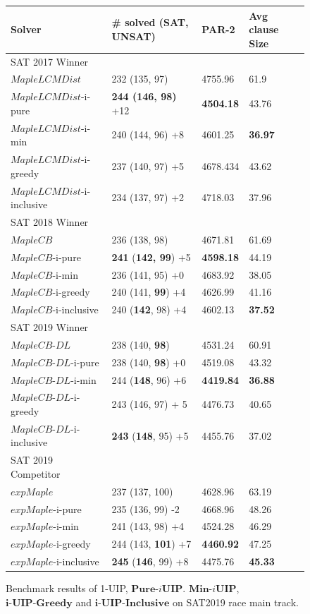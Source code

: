 \documentclass[runningheads]{llncs}
\newcommand{\IUIPPURE}{\textbf{Pure-$i$UIP}}
\newcommand{\IUIPMIN}{\textbf{Min-$i$UIP}}
\newcommand{\IUIPGreedy}{\textbf{i-UIP-Greedy}}
\newcommand{\IUIPActive}{\textbf{i-UIP-Inclusive}}
\newcommand{\MapleSeven}{\textit{MapleLCMDist}}
\newcommand{\MapleNineShort}{\textit{MapleCB-DL} }
\newcommand{\expSATShort}{\textit{expMaple} }
\newcommand{\MapleEightShort}{\textit{MapleCB}}
\begin{document}
\begin{figure} 
\begin{center}
\begin{tabular}{ | m{3.7cm} | m{4cm}| m{2cm} | m{2.75cm} |  } 
\hline
Solver & \# solved (SAT, UNSAT) & PAR-2 & Avg clause Size \\ 
\hline
SAT 2017 Winner & & & \\
$\MapleSeven$ & 232 (135, 97) & 4755.96 & 61.9  \\ 
\hline
$\MapleSeven$-i-pure & \textbf{244 (146, 98)} +12 & \textbf{4504.18} & 43.76 \\
\hline
$\MapleSeven$-i-min & 240 (144, 96) +8 & 4601.25 & \textbf{36.97} \\ 
\hline
$\MapleSeven$-i-greedy & 237 (140, 97) +5 & 4678.434 & 43.62 \\ 
\hline
$\MapleSeven$-i-inclusive & 234 (137, 97) +2 & 4718.03 & 37.96 \\
\hline
\hline
SAT 2018 Winner & & & \\
$\MapleEightShort$ & 236 (138, 98) & 4671.81 & 61.69 \\
\hline
$\MapleEightShort$-i-pure & \textbf{241} (\textbf{142, 99}) +5 & \textbf{4598.18} & 44.19 \\
\hline
$\MapleEightShort$-i-min & 236 (141, 95) +0 & 4683.92 & 38.05 \\ 
\hline
$\MapleEightShort$-i-greedy & 240 (141, \textbf{99}) +4 & 4626.99 & 41.16 \\
\hline
$\MapleEightShort$-i-inclusive & 240 (\textbf{142}, 98) +4 & 4602.13 & \textbf{37.52} \\
\hline
\hline
SAT 2019 Winner & & & \\
$\MapleNineShort$ & 238 (140, \textbf{98}) & 4531.24 & 60.91 \\
\hline
$\MapleNineShort$-i-pure & 238 (140, \textbf{98}) +0 & 4519.08 &  43.32\\
\hline
$\MapleNineShort$-i-min & 244 (\textbf{148}, 96) +6 & \textbf{4419.84} & \textbf{36.88} \\
\hline
$\MapleNineShort$-i-greedy & 243 (146, 97) + 5 & 4476.73 & 40.65 \\
\hline
$\MapleNineShort$-i-inclusive & \textbf{243} (\textbf{148}, 95) +5 & 4455.76 & 37.02 \\
\hline
\hline
SAT 2019 Competitor & & &\\
$\expSATShort$ & 237 (137, 100)  & 4628.96 & 63.19 \\
\hline
$\expSATShort$-i-pure & 235 (136, 99) -2  & 4668.96 & 48.26 \\
\hline
$\expSATShort$-i-min & 241 (143, 98) +4 & 4524.28 & 46.29 \\ 
\hline
$\expSATShort$-i-greedy & 244 (143, \textbf{101}) +7 & \textbf{4460.92} & 47.25 \\
\hline
$\expSATShort$-i-inclusive & \textbf{245} (\textbf{146}, 99) +8 & 4475.76 & \textbf{45.33} \\
\hline
\end{tabular}
\end{center}
\caption{Benchmark results of 1-UIP, $\IUIPPURE$. $\IUIPMIN$, $\IUIPGreedy$ and $\IUIPActive$ on SAT2019 race main track.}
\label{fig:t5}
\end{figure}
\end{document}
